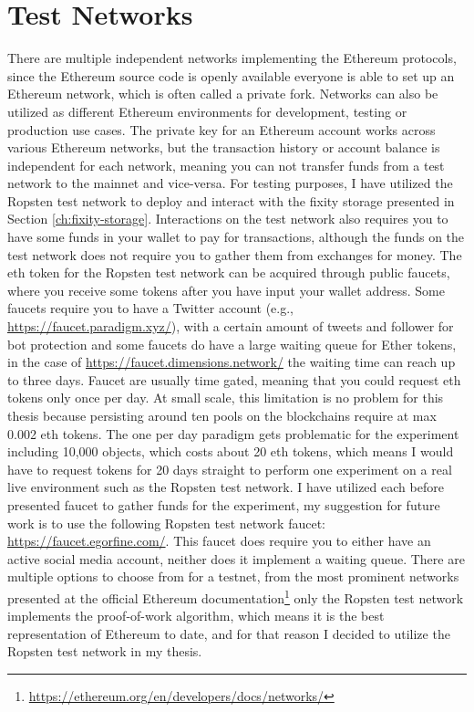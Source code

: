 \documentclass[final]{vutinfth}
\begin{document}
\section{Test Networks}\label{sec:test-nets}
There are multiple independent networks implementing the Ethereum protocols, since the Ethereum source code is openly available everyone is able to set up an Ethereum network, which is often called a private fork. Networks can also be utilized as different Ethereum environments for development, testing or production use cases. The private key for an Ethereum account works across various Ethereum networks, but the transaction history or account balance is independent for each network, meaning you can not transfer funds from a test network to the mainnet and vice-versa. For testing purposes, I have utilized the Ropsten test network to deploy and interact with the fixity storage presented in Section \ref{ch:fixity-storage}. Interactions on the test network also requires you to have some funds in your wallet to pay for transactions, although the funds on the test network does not require you to gather them from exchanges for money. The \acrlong{eth} token for the Ropsten test network can be acquired through public faucets, where you receive some tokens after you have input your wallet address. Some faucets require you to have a Twitter account (e.g., \url{https://faucet.paradigm.xyz/}), with a certain amount of tweets and follower for bot protection and some faucets do have a large waiting queue for Ether tokens, in the case of \url{https://faucet.dimensions.network/} the waiting time can reach up to three days. Faucet are usually time gated, meaning that you could request \acrlong{eth} tokens only once per day. At small scale, this limitation is no problem for this thesis because persisting around ten pools on the blockchains require at max 0.002 \acrlong{eth} tokens. The one per day paradigm gets problematic for the experiment including 10,000 objects, which costs about 20 \acrlong{eth} tokens, which means I would have to request tokens for 20 days straight to perform one experiment on a real live environment such as the Ropsten test network. I have utilized each before presented faucet to gather funds for the experiment, my suggestion for future work is to use the following Ropsten test network faucet: \url{https://faucet.egorfine.com/}. This faucet does require you to either have an active social media account, neither does it implement a waiting queue.
There are multiple options to choose from for a testnet, from the most prominent networks presented at the official Ethereum documentation\footnote{\url{https://ethereum.org/en/developers/docs/networks/}} only the Ropsten test network implements the proof-of-work algorithm, which means it is the best representation of Ethereum to date, and for that reason I decided to utilize the Ropsten test network in my thesis.
\end{document}
